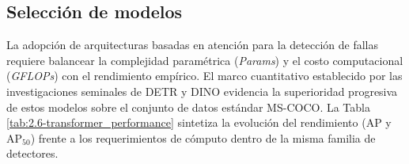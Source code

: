 \subsection{Selección de modelos}

La adopción de arquitecturas basadas en atención para la detección de fallas requiere balancear la complejidad paramétrica (\textit{Params}) y el costo computacional (\textit{GFLOPs}) con el rendimiento empírico. El marco cuantitativo establecido por las investigaciones seminales de DETR \cite{carion2020end} y DINO \cite{zhang2022dino} evidencia la superioridad progresiva de estos modelos sobre el conjunto de datos estándar MS-COCO. La Tabla \ref{tab:2.6-transformer_performance} sintetiza la evolución del rendimiento (AP y AP$_{50}$) frente a los requerimientos de cómputo dentro de la misma familia de detectores.\\

\begin{table}[H]
    \centering
    \caption{Comparativa de rendimiento y complejidad evolutiva para detectores \textit{Transformer} en MS-COCO. Datos extraídos y consolidados de \cite{carion2020end} y \cite{zhang2022dino}.}
    \label{tab:2.6-transformer_performance}
\end{table}

